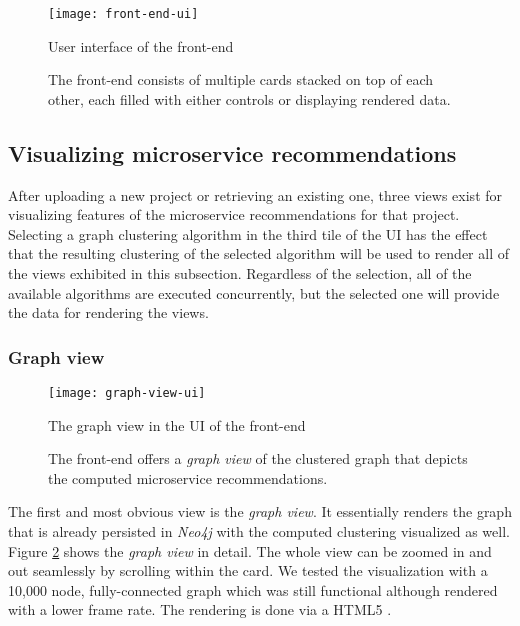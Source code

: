 \documentclass[12pt,a4paper]{report}
\begin{document}
\begin{figure}[htbp]
\centering
\texttt{[image: front-end-ui]}
\caption{User interface of the front-end}
\caption*{
  The front-end consists of multiple cards stacked on top of each other,
  each filled with either controls or displaying rendered data.
}
\label{fig:front-end-ui}
\end{figure}


\subsection{Visualizing microservice recommendations}

After uploading a new project or retrieving an existing one, three views exist
for visualizing features of the microservice recommendations for that project.
Selecting a graph clustering algorithm in the third tile of the UI
has the effect that the resulting clustering of the selected algorithm
will be used to render all of the views exhibited in this subsection.
Regardless of the selection, all of the available algorithms are executed
concurrently, but the selected one will provide the data for rendering the views.


\subsubsection{Graph view}
\begin{figure}[htbp]
\centering
\texttt{[image: graph-view-ui]}
\caption{The graph view in the UI of the front-end}
\caption*{
  The front-end offers a \textit{graph view} of the clustered graph that depicts
  the computed microservice recommendations.
}
\label{fig:graph-view-ui}
\end{figure}

The first and most obvious view is the \textit{graph view}. It essentially
renders the graph that is already persisted in \textit{Neo4j} with the
computed clustering visualized as well. Figure \ref{fig:graph-view-ui} shows
the \textit{graph view} in detail. The whole view can be zoomed in and out
seamlessly by scrolling within the card. We tested the visualization with
a 10,000 node, fully-connected graph which was still functional although
rendered with a lower frame rate. The rendering is done via a HTML5 .
\end{document}

